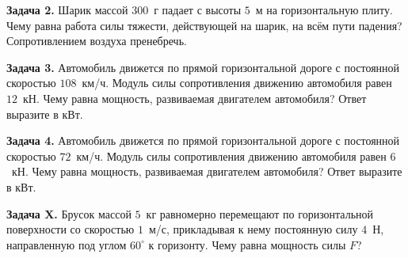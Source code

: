 \begin{taskbasic}[code={\label{task:work_v12_n3}}]
\textbf{Задача 2.} Шарик массой $300$~г падает с высоты $5$~м на горизонтальную плиту. Чему равна работа силы тяжести, действующей на шарик, на всём пути падения? Сопротивлением воздуха пренебречь.

\end{taskbasic}

\begin{taskbasic}[code={\label{task:power_v17_n3}}]
\textbf{Задача 3.} Автомобиль движется по прямой горизонтальной дороге с постоянной скоростью $108$~км/ч. Модуль силы сопротивления движению автомобиля равен $12$~кН. Чему равна мощность, развиваемая двигателем автомобиля? Ответ выразите в кВт.

\end{taskbasic}

\begin{taskbasic}[code={\label{task:power_v18_n3}}]
\textbf{Задача 4.} Автомобиль движется по прямой горизонтальной дороге с постоянной скоростью $72$~км/ч. Модуль силы сопротивления движению автомобиля равен $6$~кН. Чему равна мощность, развиваемая двигателем автомобиля? Ответ выразите в кВт.

\end{taskbasic}
\begin{taskbasic}[code={\label{task:power_inclined_force_n3}}]
\textbf{Задача X.} Брусок массой $5$~кг равномерно перемещают по горизонтальной поверхности со скоростью $1$~м/с, прикладывая к нему постоянную силу $4$~Н, направленную под углом $60^{\circ}$ к горизонту. Чему равна мощность силы $F$?

\nopagebreak\smallskip
\begin{center}
\end{center}

\end{taskbasic}

